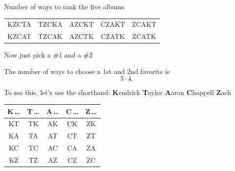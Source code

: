 \documentclass[10pt]{beamer}
\begin{document}
\begin{frame}{Number of ways to rank the five albums}
\begin{center}
\begin{tabular}{ccccc}
{\color{blue!70!black}KZCTA} & {\color{orange!80!black}TZCKA} & {\color{green!45!black}AZCKT} & {\color{red!70!black}CZAKT} & {\color{purple!70!black}ZCAKT} \\
{\color{blue!70!black}KZCAT} & {\color{orange!80!black}TZCAK} & {\color{green!45!black}AZCTK} & {\color{red!70!black}CZATK} & {\color{purple!70!black}ZCATK} \\
\end{tabular}
\end{center}
\footnotesize
{}
\end{frame}



\begin{frame}{Now just pick a \#1 and a \#2}

\footnotesize The number of ways to choose a 1st and 2nd favorite is
\[ 5 \cdot 4. \]

To see this, let's use the shorthand:
\textbf{K}endrick \quad \textbf{T}aylor \quad \textbf{A}aron \quad \textbf{C}happell \quad \textbf{Z}ach
\vfill
\begin{center}
\small\ttfamily
\setlength{\tabcolsep}{16pt}\renewcommand{\arraystretch}{1.5}
\begin{tabular}{ccccc}
\textbf{\color{blue!70!black}K\,\ldots} & \textbf{\color{orange!80!black}T\,\ldots} & \textbf{\color{green!45!black}A\,\ldots} & \textbf{\color{red!70!black}C\,\ldots} & \textbf{\color{purple!70!black}Z\,\ldots} \\[2pt]
\hline
{\color{blue!70!black}KT} & {\color{orange!80!black}TK} & {\color{green!45!black}AK} & {\color{red!70!black}CK} & {\color{purple!70!black}ZK} \\
{\color{blue!70!black}KA} & {\color{orange!80!black}TA} & {\color{green!45!black}AT} & {\color{red!70!black}CT} & {\color{purple!70!black}ZT} \\
{\color{blue!70!black}KC} & {\color{orange!80!black}TC} & {\color{green!45!black}AC} & {\color{red!70!black}CA} & {\color{purple!70!black}ZA} \\
{\color{blue!70!black}KZ} & {\color{orange!80!black}TZ} & {\color{green!45!black}AZ} & {\color{red!70!black}CZ} & {\color{purple!70!black}ZC} \\
\end{tabular}
\end{center}
\vfill

\footnotesize
{}
\end{frame}
\end{document}
